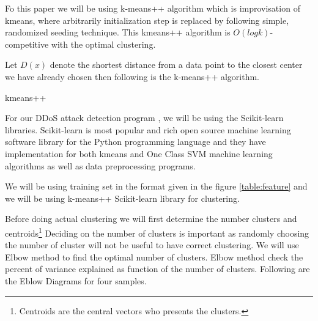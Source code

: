 \documentclass[10pt,oneside,a4paper]{article}
\begin{document}
Fo this paper we will be using k-means++ algorithm\cite{k-means++} which is improvisation of kmeans, where arbitrarily initialization step is replaced by following simple, randomized seeding technique. This kmeans++ algorithm is $O(log k)$-competitive with the optimal clustering.

Let $D(x)$ denote the shortest distance from a data point to the closest center we have already chosen then following is the k-means++ algorithm.

\begin{algorithm}
\caption{kmeans++}\label{kmeans++}
\begin{algorithmic}[1]
\end{algorithmic}
\end{algorithm}

For our DDoS attack detection program , we will be using the Scikit-learn libraries. Scikit-learn is most popular and rich open source machine learning software library for the Python programming language and they have implementation for both kmeans and One Class SVM machine learning algorithms as well as data preprocessing programs.

We will be using training set in the format given in the figure \ref{table:feature} and we will be using k-means++ Scikit-learn library for clustering.

Before doing actual clustering we will first determine the number clusters and centroids\footnote{Centroids are the central vectors who presents the clusters.} Deciding on the number of clusters is important as randomly choosing the number of cluster will not be useful to have correct clustering. We will use Elbow method to find the optimal number of clusters. Elbow method check the percent of variance explained as function of the number of clusters. Following are the Eblow Diagrams for four samples.
\end{document}
